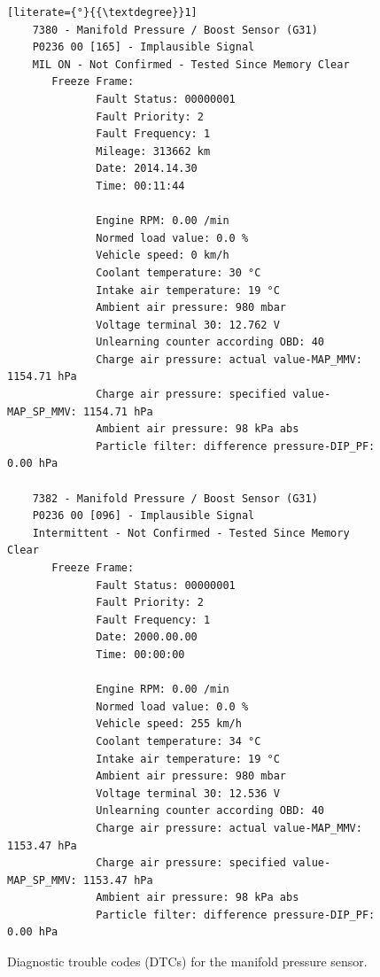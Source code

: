 \documentclass[conference,a4paper]{IEEEtran}
\begin{document}
\begin{figure}[ht]
\centering
\begin{lstlisting}[literate={°}{{\textdegree}}1]
    7380 - Manifold Pressure / Boost Sensor (G31)
    P0236 00 [165] - Implausible Signal
    MIL ON - Not Confirmed - Tested Since Memory Clear
       Freeze Frame:
              Fault Status: 00000001
              Fault Priority: 2
              Fault Frequency: 1
              Mileage: 313662 km
              Date: 2014.14.30
              Time: 00:11:44
    
              Engine RPM: 0.00 /min
              Normed load value: 0.0 %
              Vehicle speed: 0 km/h
              Coolant temperature: 30 °C
              Intake air temperature: 19 °C
              Ambient air pressure: 980 mbar
              Voltage terminal 30: 12.762 V
              Unlearning counter according OBD: 40
              Charge air pressure: actual value-MAP_MMV: 1154.71 hPa
              Charge air pressure: specified value-MAP_SP_MMV: 1154.71 hPa
              Ambient air pressure: 98 kPa abs
              Particle filter: difference pressure-DIP_PF: 0.00 hPa
    
    7382 - Manifold Pressure / Boost Sensor (G31)
    P0236 00 [096] - Implausible Signal
    Intermittent - Not Confirmed - Tested Since Memory Clear
       Freeze Frame:
              Fault Status: 00000001
              Fault Priority: 2
              Fault Frequency: 1
              Date: 2000.00.00
              Time: 00:00:00
    
              Engine RPM: 0.00 /min
              Normed load value: 0.0 %
              Vehicle speed: 255 km/h
              Coolant temperature: 34 °C
              Intake air temperature: 19 °C
              Ambient air pressure: 980 mbar
              Voltage terminal 30: 12.536 V
              Unlearning counter according OBD: 40
              Charge air pressure: actual value-MAP_MMV: 1153.47 hPa
              Charge air pressure: specified value-MAP_SP_MMV: 1153.47 hPa
              Ambient air pressure: 98 kPa abs
              Particle filter: difference pressure-DIP_PF: 0.00 hPa
\end{lstlisting}
\caption{Diagnostic trouble codes (DTCs) for the manifold pressure sensor.}
\label{fig:dtc_codes}
\end{figure}
\end{document}
